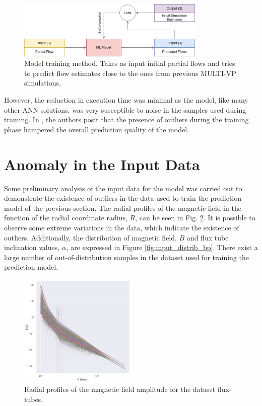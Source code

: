 \begin{figure}[!ht]
    \centering
    \includegraphics[width=0.8\textwidth]{figures/rnn_training.png}
    \caption[ML training phase]{Model training method. Takes as input initial partial flows and tries to predict flow estimates close to the ones from previous MULTI-VP simulations.\label{fig:rnn_train}}
\end{figure}

However, the reduction in execution time was minimal as the model, like many other ANN solutions, was very susceptible to noise in the samples used during training. In \cite{barros_InitialConditionEstimation_}, the authors posit that the presence of outliers during the training phase hampered the overall prediction quality of the model.


\section{Anomaly in the Input Data}\label{sec:prelim_data_analysis}
Some preliminary analysis of the input data for the model was carried out to demonstrate the existence of outliers in the data used to train the prediction model of the previous section. The radial profiles of the magnetic field in the function of the radial coordinate radius, $R$, can be seen in Fig. \ref{fig:magnetic_radius_outliers}. It is possible to observe some extreme variations in the data, which indicate the existence of outliers. Additionally, the distribution of magnetic field, $B$ and flux tube inclination values, $\alpha$, are expressed in Figure \ref{fig:input_distrib_bp}. There exist a large number of out-of-distribution samples in the dataset used for training the prediction model.


\begin{figure}[ht]
\centering
\includegraphics[width=0.5\textwidth]{figures/magnetic_radius_outliers.png}
\caption{Radial profiles of the magnetic field amplitude for the dataset flux-tubes.}
\label{fig:magnetic_radius_outliers}
\end{figure}


